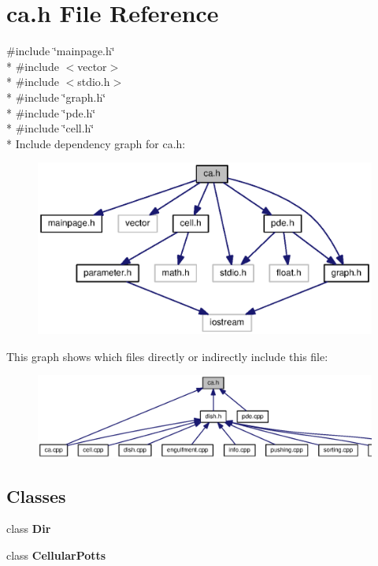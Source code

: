 \section{ca.\-h File Reference}
\label{ca_8h}
{\ttfamily \#include \char`\"{}mainpage.\-h\char`\"{}}\\*
{\ttfamily \#include $<$vector$>$}\\*
{\ttfamily \#include $<$stdio.\-h$>$}\\*
{\ttfamily \#include \char`\"{}graph.\-h\char`\"{}}\\*
{\ttfamily \#include \char`\"{}pde.\-h\char`\"{}}\\*
{\ttfamily \#include \char`\"{}cell.\-h\char`\"{}}\\*
Include dependency graph for ca.\-h\-:
\nopagebreak
\begin{figure}[H]
\begin{center}
\leavevmode
\includegraphics[width=350pt]{ca_8h__incl}
\end{center}
\end{figure}
This graph shows which files directly or indirectly include this file\-:
\nopagebreak
\begin{figure}[H]
\begin{center}
\leavevmode
\includegraphics[width=350pt]{ca_8h__dep__incl}
\end{center}
\end{figure}
\subsection*{Classes}
\begin{DoxyCompactItemize}
\item 
class {\bf Dir}
\item 
class {\bf Cellular\-Potts}
\end{DoxyCompactItemize}
